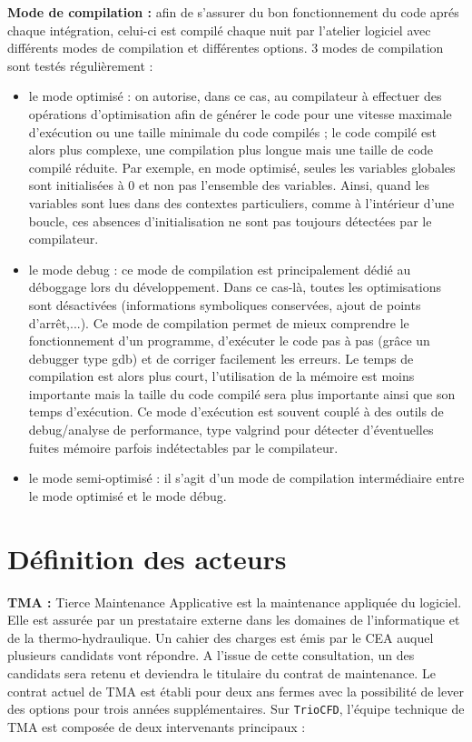 \textbf{Mode de compilation :} afin de s'assurer du bon fonctionnement du code apr\'es chaque int\'egration, celui-ci est compil\'e chaque nuit par l'atelier logiciel avec diff\'erents modes de compilation et diff\'erentes options. 3 modes de compilation sont test\'es r\'eguli\`erement : 
\begin{itemize}
  \item le mode optimis\'e : on autorise, dans ce cas, au compilateur \`a effectuer des op\'erations d'optimisation afin de g\'en\'erer le code pour une vitesse maximale d'ex\'ecution ou une taille minimale du code compil\'es ; le code compil\'e est alors plus complexe, une compilation plus longue mais une taille de code compil\'e r\'eduite. Par exemple, en mode optimis\'e, seules les variables globales sont initialis\'ees \`a 0 et non pas l'ensemble des variables. Ainsi, quand les variables sont lues dans des contextes particuliers, comme \`a l'int\'erieur d'une boucle, ces absences d'initialisation ne sont pas toujours d\'etect\'ees par le compilateur. 
  \item le mode debug : ce mode de compilation est principalement d\'edi\'e au d\'eboggage lors du d\'eveloppement. Dans ce cas-l\`a, toutes les optimisations sont d\'esactiv\'ees (informations symboliques conserv\'ees, ajout de points d'arr\^et,...). Ce mode de compilation permet de mieux comprendre le fonctionnement d'un programme, d'ex\'ecuter le code pas \`a pas (gr\^ace un debugger type gdb) et de corriger facilement les erreurs. Le temps de compilation est alors plus court, l'utilisation de la m\'emoire est moins importante mais la taille du code compil\'e sera plus   importante ainsi que son temps d'ex\'ecution. Ce mode d'ex\'ecution est souvent coupl\'e \`a des outils de debug/analyse de performance, type valgrind pour d\'etecter d'\'eventuelles fuites m\'emoire parfois ind\'etectables par le compilateur.
  \item le mode semi-optimis\'e : il s'agit d'un mode de compilation interm\'ediaire entre le mode optimis\'e et le mode d\'ebug.
\end{itemize}
\newpage

\chapter{D\'efinition des acteurs}

\textbf{TMA : } Tierce Maintenance Applicative est la maintenance appliqu\'ee du logiciel. Elle est assur\'ee par un prestataire externe dans les domaines de l'informatique et de la thermo-hydraulique. Un cahier des charges est \'emis par le CEA auquel plusieurs candidats vont r\'epondre. A l'issue de cette consultation, un des candidats sera retenu et deviendra le titulaire du contrat de maintenance. Le contrat actuel de TMA est \'etabli pour deux ans fermes avec la possibilit\'e de lever des options pour trois ann\'ees suppl\'ementaires. Sur \texttt{TrioCFD}, l'\'equipe technique de TMA est compos\'ee de deux intervenants principaux :\smallskip\newline


